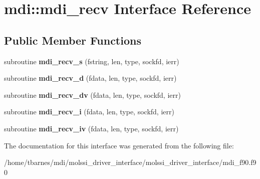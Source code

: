 \hypertarget{interfacemdi_1_1mdi__recv}{\section{mdi\-:\-:mdi\-\_\-recv Interface Reference}
\label{interfacemdi_1_1mdi__recv}
}
\subsection*{Public Member Functions}
\begin{DoxyCompactItemize}
\item 
\hypertarget{interfacemdi_1_1mdi__recv_afe159c297131305b07194ea277b8bcdd}{subroutine {\bfseries mdi\-\_\-recv\-\_\-s} (fstring, len, type, sockfd, ierr)}\label{interfacemdi_1_1mdi__recv_afe159c297131305b07194ea277b8bcdd}

\item 
\hypertarget{interfacemdi_1_1mdi__recv_ac75517b0c538096fe258fde546b25d1f}{subroutine {\bfseries mdi\-\_\-recv\-\_\-d} (fdata, len, type, sockfd, ierr)}\label{interfacemdi_1_1mdi__recv_ac75517b0c538096fe258fde546b25d1f}

\item 
\hypertarget{interfacemdi_1_1mdi__recv_ab9cc46f4ff0b31d86b44b93f72330ae8}{subroutine {\bfseries mdi\-\_\-recv\-\_\-dv} (fdata, len, type, sockfd, ierr)}\label{interfacemdi_1_1mdi__recv_ab9cc46f4ff0b31d86b44b93f72330ae8}

\item 
\hypertarget{interfacemdi_1_1mdi__recv_ab7174c24f6e240b8863cb4f41dfb297a}{subroutine {\bfseries mdi\-\_\-recv\-\_\-i} (fdata, len, type, sockfd, ierr)}\label{interfacemdi_1_1mdi__recv_ab7174c24f6e240b8863cb4f41dfb297a}

\item 
\hypertarget{interfacemdi_1_1mdi__recv_abf3328c1bad78a2141268c7ef5707613}{subroutine {\bfseries mdi\-\_\-recv\-\_\-iv} (fdata, len, type, sockfd, ierr)}\label{interfacemdi_1_1mdi__recv_abf3328c1bad78a2141268c7ef5707613}

\end{DoxyCompactItemize}


The documentation for this interface was generated from the following file\-:\begin{DoxyCompactItemize}
\item 
/home/tbarnes/mdi/molssi\-\_\-driver\-\_\-interface/molssi\-\_\-driver\-\_\-interface/mdi\-\_\-f90.\-f90\end{DoxyCompactItemize}
